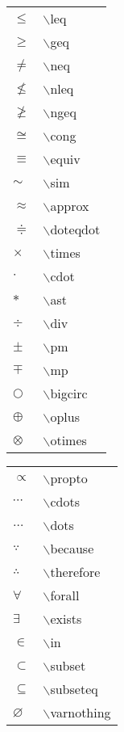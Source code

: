 \documentclass[report, twoside, UTF8, AutoFakeBold = 1, AutoFakeSlant, zihao = -4]{config}
\begin{document}
\begin{center}
    \begin{tabular}{ll}
    $\leq$ &  $\backslash$leq \\
    $\geq$ &  $\backslash$geq \\
    $\neq$ &  $\backslash$neq \\
    $\nleq$ &  $\backslash$nleq \\
    $\ngeq$ &  $\backslash$ngeq \\
    $\cong$ &  $\backslash$cong \\
    $\equiv$ &  $\backslash$equiv \\
    $\sim$ &  $\backslash$sim \\
    $\approx$ &  $\backslash$approx \\
    $\doteqdot$ &  $\backslash$doteqdot \\
    $\times$ &  $\backslash$times \\
    $\cdot $ &  $\backslash$cdot \\
    $\ast $ &  $\backslash$ast \\
    $\div$ &  $\backslash$div \\
    $\pm$ &  $\backslash$pm \\
    $\mp$ &  $\backslash$mp \\
    $\bigcirc$ &  $\backslash$bigcirc \\
    $\oplus$ &  $\backslash$oplus \\
    $\otimes$ &  $\backslash$otimes \\
    \end{tabular}
    \hspace*{1ex}
    \begin{tabular}{ll}
    $\propto $ &  $\backslash$propto \\
    $\cdots $ &  $\backslash$cdots \\
    $\dots $ &  $\backslash$dots \\
    $\because$ &  $\backslash$because \\
    $\therefore$ &  $\backslash$therefore \\
    $\forall$ &  $\backslash$forall \\
    $\exists$ &  $\backslash$exists \\
    $\in$ &  $\backslash$in \\
    $\subset $ &  $\backslash$subset \\
    $\subseteq $ &  $\backslash$subseteq \\
    $\varnothing $ &  $\backslash$varnothing  \\

\end{tabular}
\end{center}
\end{document}
